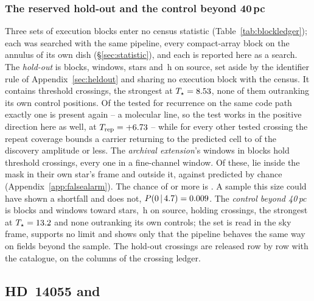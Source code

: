 \subsubsection{The reserved hold-out and the control beyond 40\,pc}
\label{sec:holdoutsearch}

Three sets of execution blocks enter no census statistic
(Table~\ref{tab:blockledger}); each was searched with the same pipeline, every
compact-array block on the annulus of its own dish (\S\ref{sec:statistic}), and
each is reported here as a search. The \emph{hold-out} is \HoNBlock{} blocks,
\HoNWin{} windows, \HoNStar{} stars and \HoHours\,h on source, set aside by the
identifier rule of Appendix~\ref{sec:heldout} and sharing no execution block
with the census. It contains \HoNCross{} threshold crossings, the strongest at
$T_\star=8.53$, none of them outranking its own control positions. Of
the \HoNTested{} tested for recurrence on the same code path exactly one is
present again -- a molecular line, so the test works in the positive direction
here as well, at $T_{\rm rep}=+6.73$ -- while for every other tested
crossing the repeat coverage bounds a carrier returning to the predicted cell
to \HoFracMax{} of the discovery amplitude or less. The \emph{archival extension}'s \LdgExtWin{}
windows in \LdgExtEB{} blocks hold \QxObsCross{} threshold crossings, every one
in a fine-channel window. Of these, \QxObsAttr{} lie inside the mask in their
own star's frame and \QxObsUnattr{} outside it, against \QxLam{} predicted by
chance (Appendix~\ref{app:falsealarm}). The chance of \QxObsUnattr{} or more is
\QxPGe{}. A sample this size could have shown a shortfall and does not,
$P(0\,|\,4.7)=0.009$. The \emph{control beyond 40\,pc} is \OosNBlock{}
blocks and \OosNWin{} windows toward \OosNStar{} stars,
\OosHours\,h on source, holding \OosNCross{} crossings, the strongest at
$T_\star=13.2$ and none outranking its own controls; the set is read in the
sky frame, supports no limit and shows only that the pipeline behaves the same way on
fields beyond the sample. The hold-out crossings are released row by row with
the catalogue, on the columns of the crossing ledger.

\subsection{HD~14055 and \BkAlmaName}
\label{sec:twostars}

